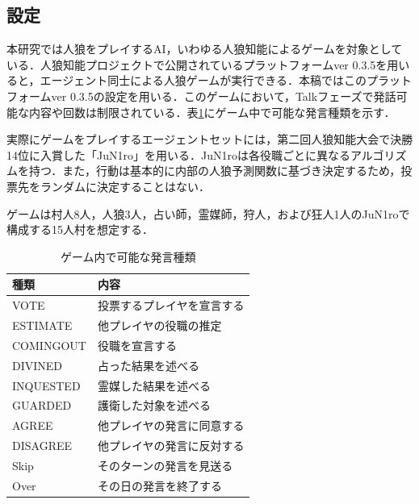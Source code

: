 \documentclass{jarticle}
\begin{document}
\subsection{設定}
本研究では人狼をプレイするAI，いわゆる人狼知能\cite{aiwolf}によるゲームを対象としている．人狼知能プロジェクト\cite{project}で公開されているプラットフォームver 0.3.5を用いると，エージェント同士による人狼ゲームが実行できる．本稿ではこのプラットフォームver 0.3.5の設定を用いる．このゲームにおいて，Talkフェーズで発話可能な内容や回数は制限されている．表\ref{tb:talk}にゲーム中で可能な発言種類を示す．\par
実際にゲームをプレイするエージェントセットには，第二回人狼知能大会で決勝14位に入賞した「JuN1ro」を用いる．JuN1roは各役職ごとに異なるアルゴリズムを持つ．また，行動は基本的に内部の人狼予測関数に基づき決定するため，投票先をランダムに決定することはない．\par
ゲームは村人8人，人狼3人，占い師，霊媒師，狩人，および狂人1人のJuN1roで構成する15人村を想定する．

 \begin{table}[t]
 \caption{ゲーム内で可能な発言種類 \label{tb:talk}}
 \begin{center}
 \begin{tabular}{|l|l|}
 \hline
  種類&内容\\
  \hline\hline
  VOTE&投票するプレイヤを宣言する\\
  \hline
  ESTIMATE&他プレイヤの役職の推定\\
  \hline
  COMINGOUT&役職を宣言する\\
  \hline
  DIVINED&占った結果を述べる\\
  \hline
  INQUESTED&霊媒した結果を述べる\\
  \hline
  GUARDED&護衛した対象を述べる\\ 
  \hline
  AGREE&他プレイヤの発言に同意する\\
  \hline
  DISAGREE&他プレイヤの発言に反対する\\
  \hline
  Skip&そのターンの発言を見送る\\
  \hline
  Over&その日の発言を終了する\\
  \hline
 \end{tabular}
 \end{center}
 \end{table}
\end{document}
